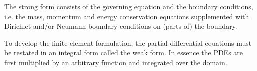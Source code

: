 
The strong form consists of the governing equation and the boundary conditions, i.e. 
the mass, momentum and energy conservation equations supplemented with Dirichlet and/or Neumann
boundary conditions on (parts of) the boundary.


To develop the finite element formulation, the partial differential equations 
must be restated in an integral form called the weak form. In essence the PDEs are 
first multiplied by an arbitrary function and integrated over the domain.

 

